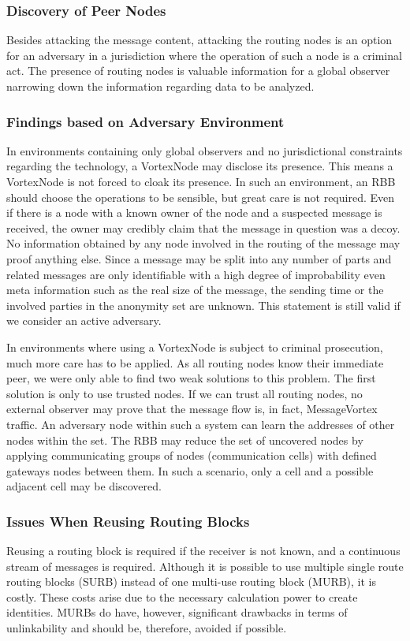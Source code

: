 \documentclass[10pt,journal,compsoc]{IEEEtran}
\begin{document}
\subsubsection{Discovery of Peer Nodes}
Besides attacking the message content, attacking the routing nodes is an option for an adversary in a jurisdiction where the operation of such a node is a criminal act. The presence of routing nodes is valuable information for a global observer narrowing down the information regarding data to be analyzed.

\subsubsection{Findings based on Adversary Environment}
In environments containing only global observers and no jurisdictional constraints regarding the technology, a VortexNode may disclose its presence. This means a VortexNode is not forced to cloak its presence. In such an environment, an RBB should choose the operations to be sensible, but great care is not required. Even if there is a node with a known owner of the node and a suspected message is received, the owner may credibly claim that the message in question was a decoy. No information obtained by any node involved in the routing of the message may proof anything else. Since a message may be split into any number of parts and related messages are only identifiable with a high degree of improbability even meta information such as the real size of the message, the sending time or the involved parties in the anonymity set are unknown. This statement is still valid if we consider an active adversary.

In environments where using a VortexNode is subject to criminal prosecution, much more care has to be applied. As all routing nodes know their immediate peer, we were only able to find two weak solutions to this problem. The first solution is only to use trusted nodes. If we can trust all routing nodes, no external observer may prove that the message flow is, in fact, MessageVortex traffic. An adversary node within such a system can learn the addresses of other nodes within the set. The RBB may reduce the set of uncovered nodes by applying communicating groups of nodes (communication cells) with defined gateways nodes between them. In such a scenario, only a cell and a possible adjacent cell may be discovered.

\subsubsection{Issues When Reusing Routing Blocks}
Reusing a routing block is required if the receiver is not known, and a continuous stream of messages is required. Although it is possible to use multiple single route routing blocks (SURB) instead of one multi-use routing block (MURB), it is costly. These costs arise due to the necessary calculation power to create identities. MURBs do have, however, significant drawbacks in terms of unlinkability and should be, therefore, avoided if possible.
\end{document}
